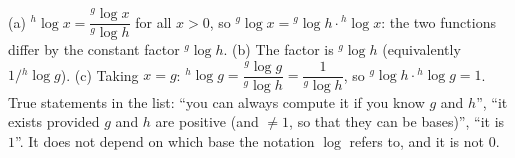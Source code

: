  (a) ${}^h\!\log x=\dfrac{{}^g\!\log x}{{}^g\!\log h}$ for all $x>0$, so ${}^g\!\log x={}^g\!\log h\cdot{}^h\!\log x$: the two functions differ by the constant factor ${}^g\!\log h$. (b) The factor is ${}^g\!\log h$ (equivalently $1/{}^h\!\log g$). (c) Taking $x=g$: ${}^h\!\log g=\dfrac{{}^g\!\log g}{{}^g\!\log h}=\dfrac1{{}^g\!\log h}$, so ${}^g\!\log h\cdot{}^h\!\log g=1$. True statements in the list: ``you can always compute it if you know $g$ and $h$'', ``it exists provided $g$ and $h$ are positive (and $\ne1$, so that they can be bases)'', ``it is $1$''. It does not depend on which base the notation $\log$ refers to, and it is not $0$.
